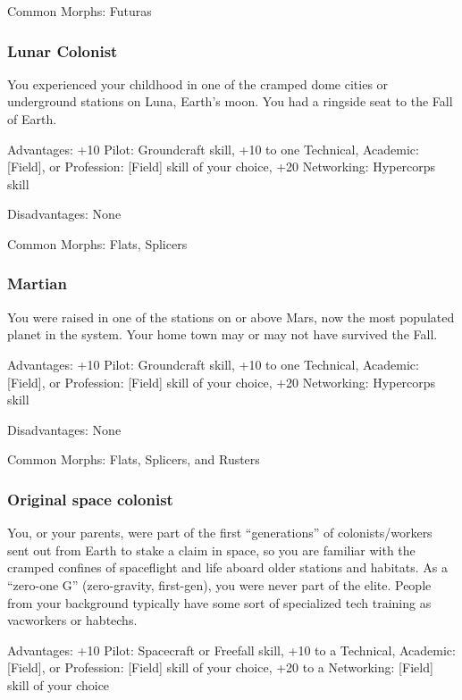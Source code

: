 Common Morphs: Futuras

\subsubsection{Lunar Colonist} %
You experienced your childhood in one of the cramped dome cities or underground
stations on Luna, Earth’s moon. You had a ringside seat to the Fall of Earth.

Advantages: +10 Pilot: Groundcraft skill, +10 to one Technical, Academic:
[Field], or Profession: [Field] skill of your choice, +20 Networking:
Hypercorps skill

Disadvantages: None

Common Morphs: Flats, Splicers


\subsubsection{Martian} %

You were raised in one of the stations on or above Mars, now the most populated
planet in the system.  Your home town may or may not have survived the Fall.
 
Advantages: +10 Pilot: Groundcraft skill, +10 to one Technical, Academic:
[Field], or Profession: [Field] skill of your choice, +20 Networking:
Hypercorps skill
 
Disadvantages: None

Common Morphs: Flats, Splicers, and Rusters

\subsubsection{Original space colonist} %

You, or your parents, were part of the first “generations” of
colonists/workers sent out from Earth to stake a claim in space, so you are
familiar with the cramped confines of spaceflight and life aboard older
stations and habitats. As a “zero-one G” (zero-gravity, first-gen), you were
never part of the elite. People from your background typically have some sort
of specialized tech training as vacworkers or habtechs.

Advantages: +10 Pilot: Spacecraft or Freefall skill, +10 to a Technical,
Academic: [Field], or Profession: [Field] skill of your choice, +20 to a
Networking: [Field] skill of your choice

